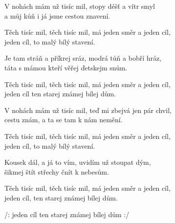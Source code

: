 
\ve{}
V nohách mám už tisíc mil, stopy déšť a vítr smyl\\
a můj kůň i já jsme cestou znavení.

Těch tisíc mil, těch tisíc mil, má jeden směr a jeden cíl,\\
jeden cíl, to malý bílý stavení.

\ve{}
Je tam stráň a příkrej sráz, modrá tůň a bobří hráz,\\
táta s mámou kteří věřej ďetskejm snům.

Těch tisíc mil, těch tisíc mil, má jeden směr a jeden cíl,\\
jeden cíl ten starej známej bílej dům.

\ve{}
V nohách mám už tisíc mil, teď mi zbejvá jen pár chvil,\\
cestu znám, a ta se tam k nám nemění.

Těch tisíc mil, těch tisíc mil, má jeden směr a jeden cíl,\\
jeden cíl, to malý bílý stavení.

\ve{}
Kousek dál, a já to vím, uvidím už stoupat dým,\\
šikmej štít střechy čnít k nebesům.

Těch tisíc mil, těch tisíc mil, má jeden směr a jeden cíl,\\
jeden cíl, ten starej známej bílej dům.

/: jeden cíl ten starej známej bílej dům :/

\esong